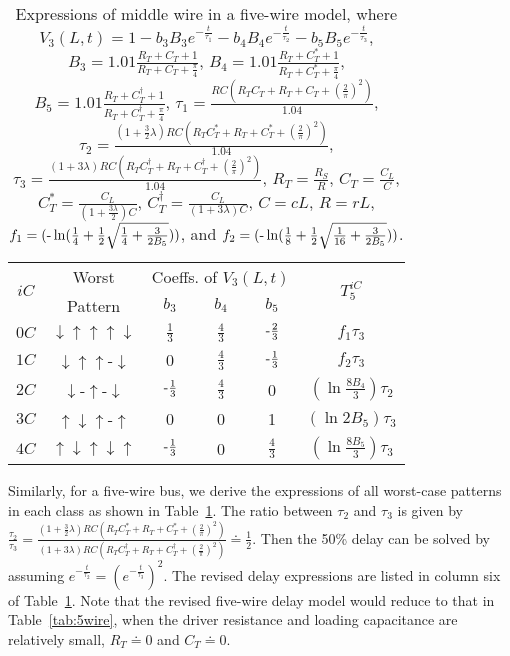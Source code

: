 \documentclass[10pt,journal]{IEEEtran}
\def\d{\downarrow}
\def\u{\uparrow}
\begin{document}
\begin{table}[!t]
\caption{Expressions of middle wire in a five-wire model, where $V_3(L,t) = 1 - b_3 B_3 e^{-\frac{t}{\tau_1}} - b_4 B_4 e^{-\frac{t}{\tau_2}} - b_5 B_5 e^{-\frac{t}{\tau_3}}$, $B_3 = 1.01\frac{R_T+C_T+1}{R_T+C_T+\frac{\pi}{4}}$, $B_4 = 1.01\frac{R_T+C_T^\ast+1}{R_T+C_T^\ast+\frac{\pi}{4}}$, $B_5 = 1.01\frac{R_T+C_T^\dagger+1}{R_T+C_T^\dagger+\frac{\pi}{4}}$, $\tau_1 = \frac{RC(R_TC_T+R_T+C_T+(\frac{2}{\pi})^2)}{1.04}$,  $\tau_2 = \frac{(1+\frac{3}{2}\lambda) RC(R_TC_T^\ast+R_T+C_T^\ast+(\frac{2}{\pi})^2)}{1.04}$, $\tau_3 = \frac{(1+3\lambda) RC(R_TC_T^\dagger+R_T+C_T^\dagger+(\frac{2}{\pi})^2)}{1.04}$,  $R_T=\frac{R_S}{R}$, $C_T=\frac{C_L}{C}$, $C_T^\ast=\frac{C_L}{(1+\frac{3\lambda}{2})C}$, $C_T^\dagger=\frac{C_L}{(1+3\lambda)C}$, $C=cL$, $R=rL$, $f_1 = (\textnormal{-}\ln (\frac{1}{4}+\frac{1}{2} \sqrt{\frac{1}{4}+\frac{3}{2 B_5}}))$, and $f_2 = (\textnormal{-}\ln (\frac{1}{8}+\frac{1}{2}\sqrt{\frac{1}{16}+\frac{3}{2 B_5}}))$.} \label{tab:5dif}
\begin{center}
\begin{tabular}{|c|c|c|c|c|c|}
\hline
\multirow{2}{*}{$iC$} & Worst & \multicolumn{3}{|c|}{Coeffs. of $V_3(L,t)$} & \multirow{2}{*}{$T_5^{iC}$}\\
\cline{3-5}
& Pattern & $b_3$ & $b_4$ & $b_5$ & \\
\hline
$0C$ & $\d\u\u\u\d$ & $\frac{1}{3}$ & $\frac{4}{3}$ & $\textnormal{-}\frac{2}{3}$ & $f_1\tau_3$ \\
\hline
$1C$ & $\d\u\u$-$\d$ & 0 & $\frac{4}{3}$ & $\textnormal{-}\frac{1}{3}$ & $f_2\tau_3$ \\
\hline
$2C$ & $\d$-$\u$-$\d$ & $\textnormal{-}\frac{1}{3}$ & $\frac{4}{3}$ & 0 & $(\ln \frac{8 B_4}{3})\tau_2$ \\
\hline
$3C$ & $\u\d\u$-$\u$ & 0 & 0 & 1 & $(\ln 2 B_5)\tau_3$ \\
\hline
$4C$ & $\u\d\u\d\u$ & $\textnormal{-}\frac{1}{3}$ & 0 & $\frac{4}{3}$ & $(\ln \frac{8 B_5}{3})\tau_3$ \\
\hline
\end{tabular}
\end{center}
\end{table}



Similarly, for a five-wire bus, we derive the expressions of all worst-case patterns in each class as shown in Table~\ref{tab:5dif}.
The ratio between $\tau_2$ and $\tau_3$ is given by $\frac{\tau_2}{\tau_3}=\frac{(1+\frac{3}{2}\lambda) RC (R_TC_T^\ast+R_T+C_T^\ast+(\frac{2}{\pi})^2) }{(1+3\lambda) RC(R_TC_T^\dagger+R_T+C_T^\dagger+(\frac{2}{\pi})^2)} \doteq \frac{1}{2}$. Then the 50\% delay can be solved by assuming $e^{-\frac{t}{\tau_2}} = (e^{-\frac{t}{\tau_3}})^2$. The revised delay expressions are listed in column six of Table~\ref{tab:5dif}.
Note that the revised five-wire delay model would reduce to that in Table~\ref{tab:5wire}, when the driver resistance and loading capacitance are relatively small, $R_T \doteq 0$ and $C_T \doteq 0$.
\end{document}
